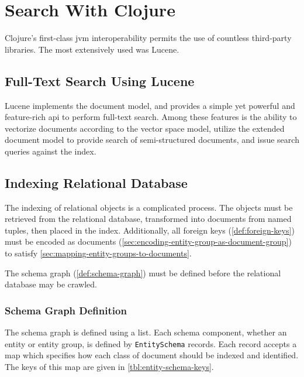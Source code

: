 \section{Search With Clojure}
\label{sec:search-with-clojure}
	Clojure's first-class \gls{jvm} interoperability permits the use of countless third-party libraries.  The most extensively used was Lucene.
	
	\subsection{Full-Text Search Using Lucene}
		  Lucene implements the document model, and provides a simple yet powerful and feature-rich \gls{api} to perform full-text search.  Among these features is the ability to vectorize documents according to the vector space model, utilize the extended document model to provide search of semi-structured documents, and issue search queries against the index.
	
	\subsection{Indexing Relational Database}
		The indexing of relational objects is a complicated process.  The objects must be retrieved from the relational database, transformed into documents from named tuples, then placed in the index.  Additionally, all foreign keys (\cref{def:foreign-keys}) must be encoded as documents (\cref{sec:encoding-entity-group-as-document-group}) to satisfy \cref{sec:mapping-entity-groups-to-documents}.
		
		The schema graph (\cref{def:schema-graph}) must be defined before the relational database may be crawled.
		
		\subsubsection{Schema Graph Definition}
		\label{sec:entity-schema}
			The schema graph is defined using a list.  Each schema component, whether an entity or entity group, is defined by \texttt{EntitySchema} records.  Each record accepts a map which specifies how each class of document should be indexed and identified.  The keys of this map are given in \cref{tbl:entity-schema-keys}.
			
